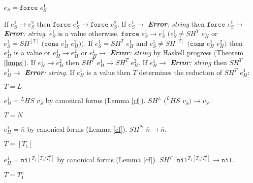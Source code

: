 \begin{case}

$e_{S}=\mathtt{force}$ $e_{S}^{1}$

If $e_{S}^{1}\rightarrow e_{S}^{2}$ then $\mathtt{force}$ $e_{S}^{1}\rightarrow\mathtt{force}$ $e_{S}^{2}$.  If $e_{S}^{1}\rightarrow$ \emph{\textbf{Error}: string} then $\mathtt{force}$ $e_{S}^{1}\rightarrow$ \emph{\textbf{Error}: string}.  $e_{S}^{1}$ is a value otherwise.  $\mathtt{force}$ $e_{S}^{1}\rightarrow e_{S}^{1}$ $(e_{S}^{1}\neq SH^{T}$ $e_{H}^{1}$ or $e_{S}^{1}=SH^{[T]}$ $(\mathtt{cons}$ $e_{H}^{1}$ $e_{H}^{2}))$.  If $e_{S}^{1}=SH^{T}$ $e_{H}^{1}$ and $e_{S}^{1}\neq SH^{[T]}$ $(\mathtt{cons}$ $e_{H}^{1}$ $e_{H}^{2})$ then $e_{H}^{1}$ is a value or $e_{H}^{1}\rightarrow e_{H}^{2}$ or $e_{H}^{1}\rightarrow$ \emph{\textbf{Error}: string} by Haskell progress (Theorem \ref{hmps}).  If $e_{H}^{1}\rightarrow e_{H}^{2}$ then $SH^{T}$ $e_{H}^{1}\rightarrow SH^{T}$ $e_{H}^{2}$.  If $e_{H}^{1}\rightarrow$ \emph{\textbf{Error}: string} then $SH^{T}$ $e_{H}^{1}\rightarrow$ \emph{\textbf{Error}: string}.  If $e_{H}^{1}$ is a value then $T$ determines the reduction of $SH^{T}$ $e_{H}^{1}$:

\begin{subcase}

$T=L$

$e_{H}^{1}={^{L}H}S$ $v_{S}$ by canonical forms (Lemma \ref{cf}).  $SH^{L}$ $(^{L}HS$ $v_{S})\rightarrow v_{S}$.

\end{subcase}

\begin{subcase}

$T=N$

$e_{H}^{1}=\overline{n}$ by canonical forms (Lemma \ref{cf}).  $SH^{N}$ $\overline{n}\rightarrow\overline{n}$.

\end{subcase}

\begin{subcase}

$T=[T_{1}]$

$e_{H}^{1}=\mathtt{nil}^{T_{1}[T_{i}/T_{i}^{a}]}$ by canonical forms (Lemma \ref{cf}).  $SH^{T_{1}}$ $\mathtt{nil}^{T_{1}[T_{i}/T_{i}^{a}]}\rightarrow\mathtt{nil}$.

\end{subcase}

\begin{subcase}

$T=T_{1}^{a}$


\end{subcase}
\end{case}
